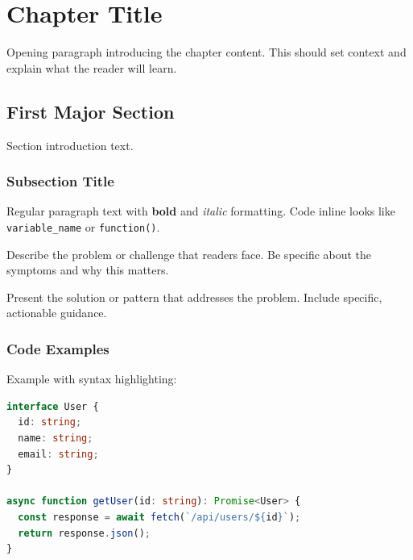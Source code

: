 
\chapter{Chapter Title}
\label{ch:chapterlabel}

Opening paragraph introducing the chapter content. This should set context
and explain what the reader will learn.

\section{First Major Section}

Section introduction text.

\subsection{Subsection Title}

Regular paragraph text with \textbf{bold} and \textit{italic} formatting.
Code inline looks like \texttt{variable\_name} or \texttt{function()}.

\begin{problembox}
Describe the problem or challenge that readers face. Be specific about
the symptoms and why this matters.
\end{problembox}

\begin{solutionbox}
Present the solution or pattern that addresses the problem. Include
specific, actionable guidance.
\end{solutionbox}

\subsection{Code Examples}

Example with syntax highlighting:

\begin{lstlisting}[language=typescript]
interface User {
  id: string;
  name: string;
  email: string;
}

async function getUser(id: string): Promise<User> {
  const response = await fetch(`/api/users/${id}`);
  return response.json();
}
\end{lstlisting}

